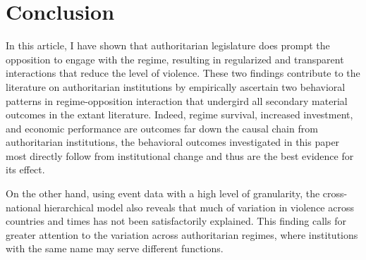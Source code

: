 \section{Conclusion}
\label{sec:conclusion}

In this article, I have shown that authoritarian legislature does prompt the opposition to engage with the regime, resulting in regularized and transparent interactions that reduce the level of violence. These two findings contribute to the literature on authoritarian institutions by empirically ascertain two behavioral patterns in regime-opposition interaction that undergird all secondary material outcomes in the extant literature. Indeed, regime survival, increased investment, and economic performance are outcomes far down the causal chain from authoritarian institutions, the behavioral outcomes investigated in this paper most directly follow from institutional change and thus are the best evidence for its effect.

On the other hand, using event data with a high level of granularity, the cross-national hierarchical model also reveals that much of variation in violence across countries and times has not been satisfactorily explained. This finding calls for greater attention to the variation across authoritarian regimes, where institutions with the same name may serve different functions.